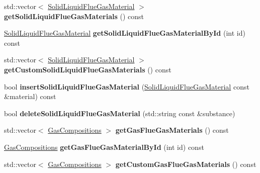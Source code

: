\begin{DoxyCompactItemize}
\item 
\mbox{\label{class_s_q_lite_aecba5bffe035af787b17b5bf5997d825}} 
std\+::vector$<$ \hyperlink{class_solid_liquid_flue_gas_material}{Solid\+Liquid\+Flue\+Gas\+Material} $>$ {\bfseries get\+Solid\+Liquid\+Flue\+Gas\+Materials} () const
\item 
\mbox{\label{class_s_q_lite_aa7ea5aa679227d695fe38848236281ee}} 
\hyperlink{class_solid_liquid_flue_gas_material}{Solid\+Liquid\+Flue\+Gas\+Material} {\bfseries get\+Solid\+Liquid\+Flue\+Gas\+Material\+By\+Id} (int id) const
\item 
\mbox{\label{class_s_q_lite_a23b34dae2fa12690d3718755fc373b42}} 
std\+::vector$<$ \hyperlink{class_solid_liquid_flue_gas_material}{Solid\+Liquid\+Flue\+Gas\+Material} $>$ {\bfseries get\+Custom\+Solid\+Liquid\+Flue\+Gas\+Materials} () const
\item 
\mbox{\label{class_s_q_lite_aa1de7450c37a07dfd0541fdf0dc164ef}} 
bool {\bfseries insert\+Solid\+Liquid\+Flue\+Gas\+Material} (\hyperlink{class_solid_liquid_flue_gas_material}{Solid\+Liquid\+Flue\+Gas\+Material} const \&material) const
\item 
\mbox{\label{class_s_q_lite_a56fb2567626738b5d702a73617bb28d0}} 
bool {\bfseries delete\+Solid\+Liquid\+Flue\+Gas\+Material} (std\+::string const \&substance)
\item 
\mbox{\label{class_s_q_lite_a7f054c9a3a3954277c5de8d4048a40f9}} 
std\+::vector$<$ \hyperlink{class_gas_compositions}{Gas\+Compositions} $>$ {\bfseries get\+Gas\+Flue\+Gas\+Materials} () const
\item 
\mbox{\label{class_s_q_lite_a230049a94b9e2ff84d19fcd5a087954c}} 
\hyperlink{class_gas_compositions}{Gas\+Compositions} {\bfseries get\+Gas\+Flue\+Gas\+Material\+By\+Id} (int id) const
\item 
\mbox{\label{class_s_q_lite_a8cd9d62714f1083bab16e388dabc59be}} 
std\+::vector$<$ \hyperlink{class_gas_compositions}{Gas\+Compositions} $>$ {\bfseries get\+Custom\+Gas\+Flue\+Gas\+Materials} () const
\item 
\mbox{\label{class_s_q_lite_a95d5521ed0de19c979ac9627ae21fbcd}} 

\end{DoxyCompactItemize}
